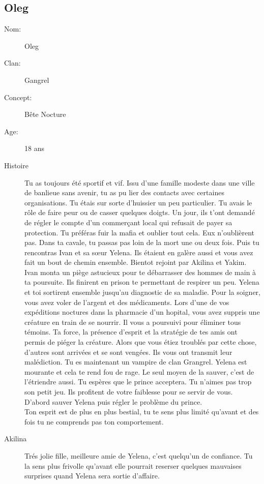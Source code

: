 \documentclass[oneside,12pt]{book}
\begin{document}
\begin{flushleft}
\section{Oleg}
\begin{description}
\item[Nom:]{Oleg}
\item[Clan:]{Gangrel}
\item[Concept:]{Bête Nocture}
\item[Age:]{18 ans}
\item[Histoire]{ Tu as toujours été sportif et vif. Issu d'une famille modeste dans une ville de banlieue sans avenir, tu as pu lier des contacts avec certaines organisations. Tu étais sur sorte d'huissier un peu particulier.
Tu avais le rôle de faire peur ou de casser quelques doigts. Un jour, ils t'ont demandé de régler le compte d'un commerçant local qui refusait de payer sa protection.
Tu préféras fuir la mafia et oublier tout cela. Eux n'oublièrent pas. Dans ta cavale, tu passas pas loin de la mort une ou deux fois.
Puis tu rencontras Ivan et sa sœur Yelena. Ils étaient en galère aussi et vous avez fait un bout de chemin ensemble. Bientot rejoint par Akilina et Yakim. Ivan monta un piège astucieux pour te débarrasser des hommes de main à ta poursuite.
Ils finirent en prison te permettant de respirer un peu. Yelena et toi sortirent ensemble jusqu'au diagnostic de sa maladie.
Pour la soigner, vous avez voler de l'argent et des médicaments.
Lors d'une de vos expéditions noctures dans la pharmacie d'un hopital, vous avez suppris une créature en train de se nourrir.
Il vous a poursuivi pour éliminer tous témoins. Ta force, la présence d'esprit et la stratégie de tes amis ont permis de piéger la créature.
Alors que vous étiez troublés par cette chose, d'autres sont arrivées et se sont vengées. Ils vous ont transmit leur malédiction. Tu es maintenant un vampire de clan Grangrel.
Yelena est mourante et cela te rend fou de rage. Le seul moyen de la sauver, c'est de l'étriendre aussi. Tu espères que le prince acceptera. Tu n'aimes pas trop son petit jeu.
Ils profitent de votre faiblesse pour se servir de vous.  D'abord sauver Yelena puis régler le problème du prince.
\\
Ton esprit est de plus en plus bestial, tu te sens plus limité qu'avant et des fois tu ne comprends pas ton comportement. 
}
\end{description}
\begin{description}
\item[Akilina]{Trés jolie fille, meilleure amie de Yelena, c'est quelqu'un de confiance. Tu la sens plus frivolle qu'avant elle pourrait reserser quelques mauvaises surprises quand Yelena sera sortie d'affaire.
}
\end{description}
\end{flushleft}
\end{document}
